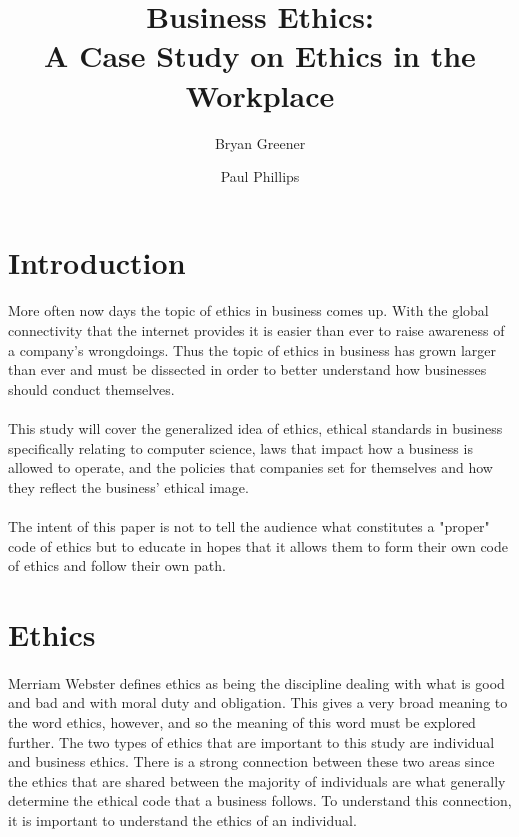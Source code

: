 \documentclass[notitlepage,a4paper,12pt]{article}
\author{Bryan Greener \and Paul Phillips}
\title{Business Ethics:\\A Case Study on Ethics in the Workplace}
\newcommand{\mychapter}[2]{
	\setcounter{chapter}{#1}
	\setcounter{section}{0}
	\chapter*{#2}
	\addcontentsline{toc}{chapter}{#2}
}
\begin{document}
\maketitle
\thispagestyle{empty}
\clearpage
\setcounter{page}{1}
\section*{Introduction}
\paragraph{}More often now days the topic of ethics in business comes up. With the global connectivity that the internet provides it is easier than ever to raise awareness of a company's wrongdoings. Thus the topic of ethics in business has grown larger than ever and must be dissected in order to better understand how businesses should conduct themselves.

\paragraph{}This study will cover the generalized idea of ethics, ethical standards in business specifically relating to computer science, laws that impact how a business is allowed to operate, and the policies that companies set for themselves and how they reflect the business' ethical image.

\paragraph{}The intent of this paper is not to tell the audience what constitutes a "proper" code of ethics but to educate in hopes that it allows them to form their own code of ethics and follow their own path.

\section*{Ethics}
\paragraph{}Merriam Webster defines ethics as being the discipline dealing with what is good and bad and with moral duty and obligation. This gives a very broad meaning to the word ethics, however, and so the meaning of this word must be explored further. The two types of ethics that are important to this study are individual and business ethics. There is a strong connection between these two areas since the ethics that are shared between the majority of individuals are what generally determine the ethical code that a business follows. To understand this connection, it is important to understand the ethics of an individual.
\end{document}
